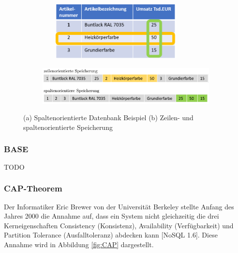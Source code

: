 \begin{figure}[h]
	\begin{subfigure}{\textwidth}
		\centering
		\includegraphics[width=8cm, height = 3cm]{images/SpaltenorientiereDatenbank.png}
		\caption{}
		\label{fig:spalten_zeilen_speicher}
	\end{subfigure}
	\newline
	\begin{subfigure}{\textwidth}
		\centering
		\includegraphics[width=15cm]{images/zeilenspaltenorientiert.png}
		\caption{ }
		\label{fig:spalten_zeilen}
	\end{subfigure}
	\caption[Zeilen- und spaltenorientierte Speicherung]{(a) Spaltenorientierte Datenbank Beispiel (b) Zeilen- und spaltenorientierte Speicherung \protect \footnotemark}
\label{fig:Spaltenorientiert}
\end{figure}

\subsubsection{BASE}
TODO
\newline

\subsubsection{CAP-Theorem}
Der Informatiker Eric Brewer von der Universität Berkeley stellte Anfang des Jahres 2000 die Annahme auf, dass ein System nicht gleichzeitig die drei Kerneigenschaften Consistency (Konsistenz), Availability (Verfügbarkeit) und Partition Tolerance (Ausfalltoleranz) abdecken kann [NoSQL 1.6]. Diese Annahme wird in Abbildung \ref{fig:CAP} dargestellt.
\newline

